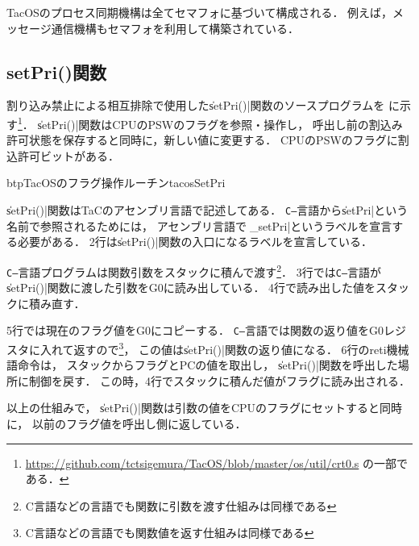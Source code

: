 TacOSのプロセス同期機構は全てセマフォに基づいて構成される．
例えば，メッセージ通信機構もセマフォを利用して構築されている．

\subsection{setPri()関数}
\label{setPri}
割り込み禁止による相互排除で使用した\|setPri()|関数のソースプログラムを
に示す\footnote{
\url{https://github.com/tctsigemura/TacOS/blob/master/os/util/crt0.s}
の一部である．}．
\|setPri()|関数はCPUのPSWのフラグを参照・操作し，
呼出し前の割込み許可状態を保存すると同時に，新しい値に変更する．
CPUのPSWのフラグに割込許可ビットがある．

\begin{myfig}{btp}{TacOSのフラグ操作ルーチン}{tacosSetPri}

\end{myfig}

\|setPri()|関数はTaCのアセンブリ言語で記述してある．
{\tt C--}言語から\|setPri|という名前で参照されるためには，
アセンブリ言語では\|_setPri|というラベルを宣言する必要がある．
2行は\|setPri()|関数の入口になるラベルを宣言している．

{\tt C--}言語プログラムは関数引数をスタックに積んで渡す\footnote{
C言語などの言語でも関数に引数を渡す仕組みは同様である}．
3行では{\tt C--}言語が\|setPri()|関数に渡した引数をG0に読み出している．
4行で読み出した値をスタックに積み直す．

5行では現在のフラグ値をG0にコピーする．
{\tt C--}言語では関数の返り値をG0レジスタに入れて返すので\footnote{
C言語などの言語でも関数値を返す仕組みは同様である}，
この値は\|setPri()|関数の返り値になる．
6行のreti機械語命令は，
スタックからフラグとPCの値を取出し，
\|setPri()|関数を呼出した場所に制御を戻す．
この時，4行でスタックに積んだ値がフラグに読み出される．

以上の仕組みで，
\|setPri()|関数は引数の値をCPUのフラグにセットすると同時に，
以前のフラグ値を呼出し側に返している．
